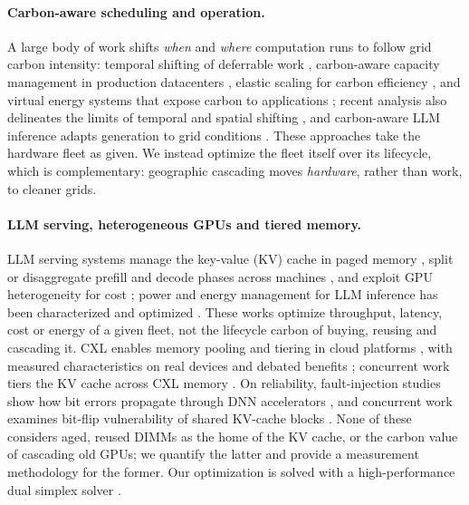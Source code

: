 \documentclass[11pt]{article}
\begin{document}
\paragraph{Carbon-aware scheduling and operation.}
A large body of work shifts \emph{when} and \emph{where} computation runs to follow grid carbon intensity: temporal shifting of deferrable work \citep{wiesner2021letswait}, carbon-aware capacity management in production datacenters \citep{radovanovic2023cics}, elastic scaling for carbon efficiency \citep{hanafy2024carbonscaler}, and virtual energy systems that expose carbon to applications \citep{souza2023ecovisor}; recent analysis also delineates the limits of temporal and spatial shifting \citep{sukprasert2024limitations}, and carbon-aware LLM inference adapts generation to grid conditions \citep{li2024sprout}. These approaches take the hardware fleet as given. We instead optimize the fleet itself over its lifecycle, which is complementary: geographic cascading moves \emph{hardware}, rather than work, to cleaner grids.

\paragraph{LLM serving, heterogeneous GPUs and tiered memory.}
LLM serving systems manage the key-value (KV) cache in paged memory \citep{kwon2023vllm}, split or disaggregate prefill and decode phases across machines \citep{patel2024splitwise,zhong2024distserve}, and exploit GPU heterogeneity for cost \citep{griggs2024melange}; power and energy management for LLM inference has been characterized and optimized \citep{patel2024power,stojkovic2024greener,stojkovic2025dynamollm}. These works optimize throughput, latency, cost or energy of a given fleet, not the lifecycle carbon of buying, reusing and cascading it. CXL enables memory pooling and tiering in cloud platforms \citep{li2023pond,berger2023cxlpooling,maruf2023tpp}, with measured characteristics on real devices \citep{sun2023demystifying} and debated benefits \citep{caseagainstcxl2023}; concurrent work tiers the KV cache across CXL memory \citep{rwcache2026}. On reliability, fault-injection studies show how bit errors propagate through DNN accelerators \citep{li2017dnnerrors}, and concurrent work examines bit-flip vulnerability of shared KV-cache blocks \citep{bitflipkv2026}. None of these considers aged, reused DIMMs as the home of the KV cache, or the carbon value of cascading old GPUs; we quantify the latter and provide a measurement methodology for the former. Our optimization is solved with a high-performance dual simplex solver \citep{huangfu2018highs}.
\end{document}
